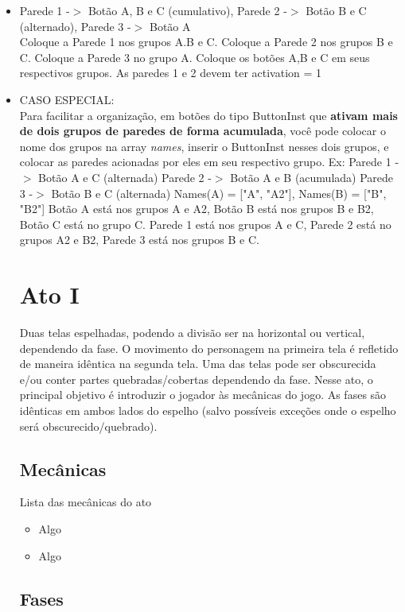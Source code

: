 \documentclass[a4paper, 11pt]{article}
\begin{document}
\begin{itemize}
				\item Parede 1 -$>$ Botão A, B e C (cumulativo), Parede 2 -$>$ Botão B e C (alternado), Parede 3 -$>$ Botão A
				\\
				Coloque a Parede 1 nos grupos A.B e C. Coloque a Parede 2 nos grupos B e C. Coloque a Parede 3 no grupo A. Coloque os botões A,B e C em seus respectivos grupos.
				As paredes 1 e 2 devem ter activation = 1
				\item CASO ESPECIAL: \\
				Para facilitar a organização, em botões do tipo ButtonInst que \textbf{ativam mais de dois grupos de paredes de forma acumulada}, você pode colocar o nome dos grupos na array \textit{names}, inserir o ButtonInst nesses dois grupos, e colocar as paredes acionadas por eles em seu respectivo grupo.
				Ex:
				Parede 1 -$>$ Botão A e C (alternada)
				Parede 2 -$>$ Botão A e B (acumulada) 
 				Parede 3 -$>$ Botão B e C (alternada)
 				Names(A) = ["A", "A2"], Names(B) = ["B", "B2"]
 				Botão A está nos grupos A e A2, Botão B está nos grupos B e B2, Botão C está no grupo C.
 				Parede 1 está nos grupos A e C, Parede 2 está no grupos A2 e B2, Parede 3 está nos grupos B e C.

\section{Ato I} 
 
	Duas telas espelhadas, podendo a divisão ser na horizontal ou vertical, dependendo da fase. O movimento do 
	personagem na primeira tela é refletido de maneira idêntica na segunda tela. Uma das telas pode ser obscurecida 
	e/ou conter partes quebradas/cobertas dependendo da fase. 
	Nesse ato, o principal objetivo é introduzir o jogador às mecânicas do jogo. As fases são idênticas 
	em ambos lados do espelho (salvo possíveis exceções onde o espelho será obscurecido/quebrado). 
 
\subsection{Mecânicas} 
 
	Lista das mecânicas do ato 
	\begin{itemize} 
		\item Algo 
		\item Algo 
	\end{itemize} 
 
\subsection{Fases} 
 

\end{itemize}
\end{document}
